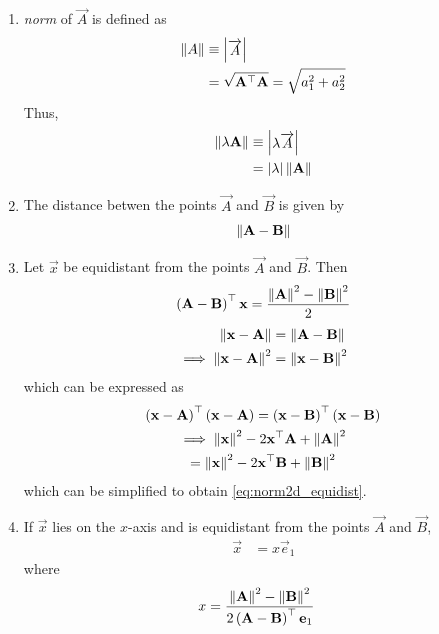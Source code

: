\documentclass[journal,12pt,twocolumn]{IEEEtran}
\renewcommand\thesection{\arabic{section}}
\renewcommand\thesubsection{\thesection.\arabic{subsection}}
\begin{document}
\begin{enumerate}[label=\thesubsection.\arabic*.,ref=\thesubsection.\theenumi]
%
\item {\em norm} of $\vec{A}$ is defined as
\begin{align}
  \label{eq:norm2d}
  \left\lVert A\right\rVert &\equiv \begin{vmatrix}\overrightarrow{A}\end{vmatrix}
  \\
  &= \sqrt{\mathbf{A}^{\top} \mathbf{A}}= \sqrt{a_1^2+a_2^2}
\end{align}
Thus, 
\begin{align}
  \label{eq:norm2d_const}
  \left\lVert\lambda \mathbf{A}\right\rVert &\equiv \begin{vmatrix}\lambda\overrightarrow{A}\end{vmatrix}
  \\
  &= \left\vert\lambda\right\vert \left\lVert\mathbf{A}\right\rVert
\end{align}
\item The distance betwen the points $\vec{A}$ and $\vec{B}$ is given by 
\begin{align}
  \label{eq:norm2d_dist}
\left\lVert\mathbf{A}-\mathbf{B}\right\rVert 
\end{align}
\item Let $\vec{x}$ be equidistant from the points $\vec{A}$ and $\vec{B}$.  Then 
  \begin{align}
	  \left(\mathbf{A}-\mathbf{B}\right)^{\top}{\mathbf{x}} 
	  =  \frac{\left\lVert\mathbf{A}\right\rVert^2 - \left\lVert\mathbf{B}\right\rVert^2}{2}
  \label{eq:norm2d_equidist}
  \end{align}
  \solution 
\begin{align}
	\left\lVert\mathbf{x}-\mathbf{A}\right\rVert &=
\left\lVert\mathbf{A}-\mathbf{B}\right\rVert 
\\
	\implies \left\lVert\mathbf{x}-\mathbf{A}\right\rVert^2 &=
\left\lVert\mathbf{x}-\mathbf{B}\right\rVert^2 
\end{align}
which can be expressed as 
\begin{multline}
	\left(\mathbf{x}-\mathbf{A}\right)^{\top} \left(\mathbf{x}-\mathbf{A}\right)=
	\left(\mathbf{x}-\mathbf{B}\right)^{\top} 
\left(\mathbf{x}-\mathbf{B}\right)
\\
	\implies	\left\lVert\mathbf{x}\right\rVert^2-2{\mathbf{x}}^{\top}\mathbf{A} + \left\lVert\mathbf{A}\right\rVert^2
	\\= \left\lVert\mathbf{x}\right\rVert^2-2{\mathbf{x}}^{\top}\mathbf{B} + \left\lVert\mathbf{B}\right\rVert^2
\end{multline}
which can be simplified to obtain
  \eqref{eq:norm2d_equidist}.
\item If $\vec{x}$ lies on the  $x$-axis and is  equidistant from the points $\vec{A}$ and $\vec{B}$, 
  \begin{align}
	  \vec{x} &=
	   x\vec{e}_1
  \end{align}
  where 
  \begin{align}
	  x &=\frac{\left\lVert\mathbf{A}\right\rVert^2 -\left\lVert\mathbf{B}\right\rVert^2 }{2\left(\mathbf{A}-\mathbf{B}\right)^{\top }\mathbf{e}_1
}
	  \label{eq:cbse_10_x}
  \end{align}

\end{enumerate}
\end{document}
